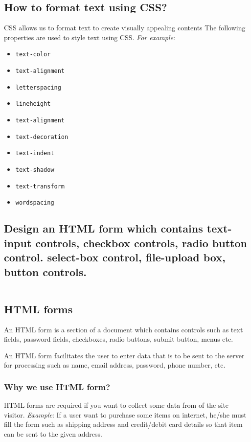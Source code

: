 \documentclass[a4paper]{article}
\begin{document}
  \subsection{How to format text using CSS?}%
  CSS allows us to format text to create visually appealing contents
  The following properties are used to style text using CSS.
  \textit{For example}:
  \begin{itemize}
    \item \texttt{text-color}
    \item \texttt{text-alignment}
    \item \texttt{letterspacing}
    \item \texttt{lineheight}
    \item \texttt{text-alignment}
    \item \texttt{text-decoration}
    \item \texttt{text-indent}
    \item \texttt{text-shadow}
    \item \texttt{text-transform}
    \item \texttt{wordspacing}
  \end{itemize}%

  \subsection{Design an HTML form which contains text-input controls,%
  checkbox controls, radio button control. select-box control, file-upload
  box, button controls.}
  \begin{lstlisting}
  \end{lstlisting}%

  \subsection{HTML forms}
  An HTML form is a section of a document which contains controls such as 
  text fields, password fields, checkboxes, radio buttons, submit button, 
  menus etc.

  An HTML form facilitates the user to enter data that is to be sent to the 
  server for processing such as name, email address, password, phone number,
  etc.

    \subsubsection{Why we use HTML form?}
    HTML forms are required if you want to collect some data from of the site 
    visitor. \textit{Example}: If a user want to purchase some items on 
    internet, he/she must fill the form such as shipping address and
    credit/debit card details so that item can be sent to the given address.
\end{document}
